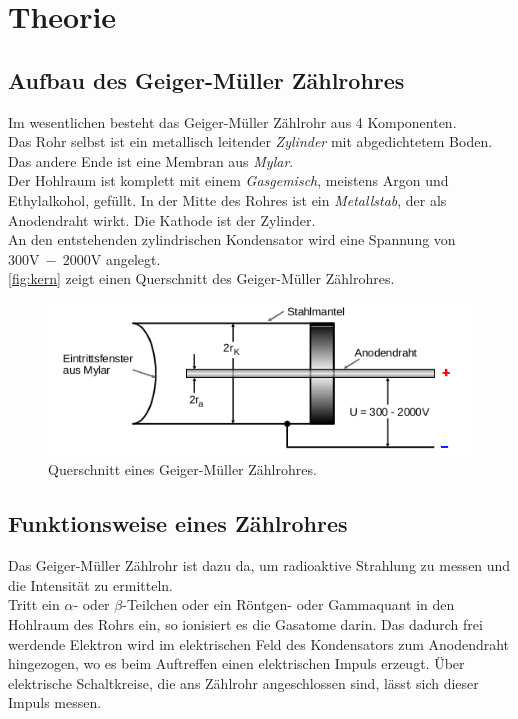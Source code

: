 \section{Theorie}
\label{sec:Theorie}

\subsection{Aufbau des Geiger-Müller Zählrohres}
Im wesentlichen besteht das Geiger-Müller Zählrohr aus 4 Komponenten.\\
Das Rohr selbst ist ein metallisch leitender \textit{Zylinder} mit abgedichtetem Boden.
Das andere Ende ist eine Membran aus \textit{Mylar}.\\
Der Hohlraum ist komplett mit einem \textit{Gasgemisch}, meistens Argon und Ethylalkohol, gefüllt.
In der Mitte des Rohres ist ein \textit{Metallstab}, der als Anodendraht wirkt.
Die Kathode ist der Zylinder.\\
An den entstehenden zylindrischen Kondensator wird eine Spannung von $300\si{\volt}\ -\ 2000\si{\volt}$ angelegt.\\
\autoref{fig:kern} zeigt einen Querschnitt des Geiger-Müller Zählrohres.

\begin{figure}[htbp]
    \centering
    \includegraphics[scale=0.7]{Pics/quer.png}
    \caption{Querschnitt eines Geiger-Müller Zählrohres.}
    \label{fig:kern}
\end{figure}

\subsection{Funktionsweise eines Zählrohres}
Das Geiger-Müller Zählrohr ist dazu da, um radioaktive Strahlung zu messen und die Intensität zu ermitteln.\\
Tritt ein $\alpha$- oder $\beta$-Teilchen oder ein Röntgen- oder Gammaquant in den Hohlraum des Rohrs ein, so ionisiert es die Gasatome darin.
Das dadurch frei werdende Elektron wird im elektrischen Feld des Kondensators zum Anodendraht hingezogen, wo es beim Auftreffen einen elektrischen Impuls erzeugt.
Über elektrische Schaltkreise, die ans Zählrohr angeschlossen sind, lässt sich dieser Impuls messen.
